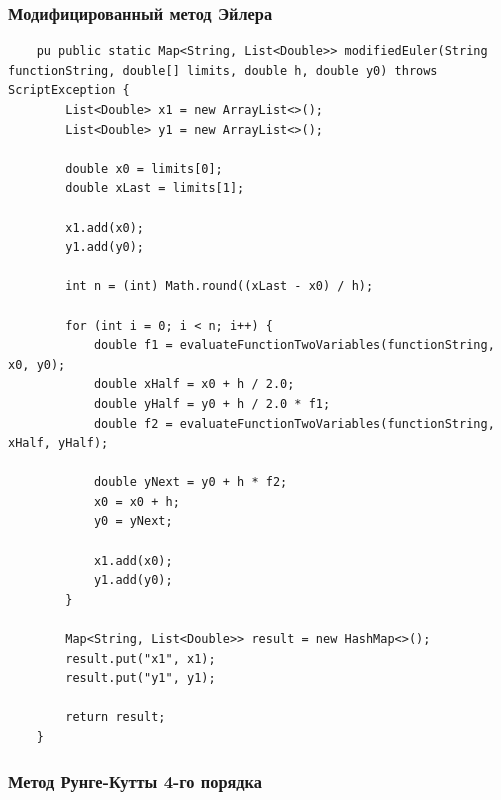 \documentclass[12pt]{article}
\begin{document}
    \subsubsection{Модифицированный метод Эйлера}

    \begin{verbatim}
    pu public static Map<String, List<Double>> modifiedEuler(String functionString, double[] limits, double h, double y0) throws ScriptException {
        List<Double> x1 = new ArrayList<>();
        List<Double> y1 = new ArrayList<>();

        double x0 = limits[0];
        double xLast = limits[1];

        x1.add(x0);
        y1.add(y0);

        int n = (int) Math.round((xLast - x0) / h);

        for (int i = 0; i < n; i++) {
            double f1 = evaluateFunctionTwoVariables(functionString, x0, y0);
            double xHalf = x0 + h / 2.0;
            double yHalf = y0 + h / 2.0 * f1;
            double f2 = evaluateFunctionTwoVariables(functionString, xHalf, yHalf);

            double yNext = y0 + h * f2;
            x0 = x0 + h;
            y0 = yNext;

            x1.add(x0);
            y1.add(y0);
        }

        Map<String, List<Double>> result = new HashMap<>();
        result.put("x1", x1);
        result.put("y1", y1);

        return result;
    }
    \end{verbatim}

    \subsubsection{Метод Рунге-Кутты 4-го порядка}
\end{document}
